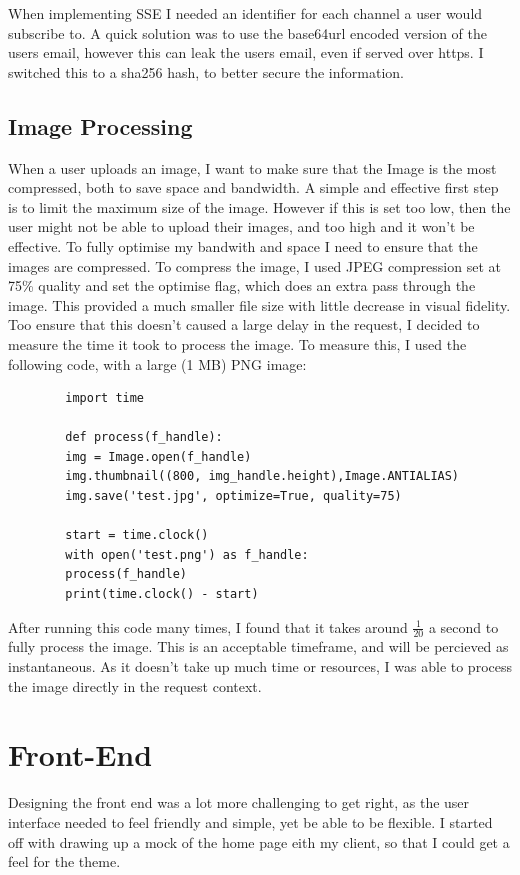 \documentclass[12pt, draft]{report}
\begin{document}
	When implementing SSE I needed an identifier for each channel a user would subscribe to. A quick solution was to use the base64url encoded version of the users email, however this can leak the users email, even if served over https. I switched this to a sha256 hash, to better secure the information.

	\subsection{Image Processing}
	When a user uploads an image, I want to make sure that the Image is the most compressed, both to save space and bandwidth.
	A simple and effective first step is to limit the maximum size of the image. However if this is set too low, then the user might not be able to upload their images, and too high and it won't be effective. To fully optimise my bandwith and space I need to ensure that the images are compressed. To compress the image, I used JPEG compression set at 75\% quality and set the optimise flag, which does an extra pass through the image. This provided a much smaller file size with little decrease in visual fidelity. Too ensure that this doesn't caused a large delay in the request, I decided to measure the time it took to process the image. To measure this, I used the following code, with a large (1 MB) PNG image:

	\begin{lstlisting}
		import time

		def process(f_handle):
		img = Image.open(f_handle)
		img.thumbnail((800, img_handle.height),Image.ANTIALIAS)
		img.save('test.jpg', optimize=True, quality=75)

		start = time.clock()
		with open('test.png') as f_handle:
		process(f_handle)
		print(time.clock() - start)
	\end{lstlisting}

	After running this code many times, I found that it takes around \(\frac{1}{20}\) a second to fully process the image. This is an acceptable timeframe, and will be percieved as instantaneous. As it doesn't take up much time or resources, I was able to process the image directly in the request context.


	\section{Front-End}
	Designing the front end was a lot more challenging to get right, as the user interface needed to feel friendly and simple, yet be able to be flexible. I started off with drawing up a mock of the home page eith my client, so that I could get a feel for the theme.
\end{document}
